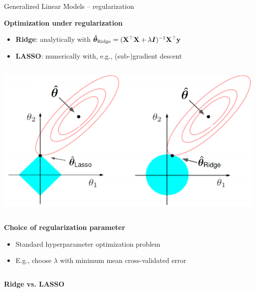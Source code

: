 \documentclass[11pt,compress,t,notes=noshow, xcolor=table]{beamer}
\newcommand{\highlight}[1]{\textcolor{hlcol}{\textbf{#1}}}
\begin{document}
\begin{vbframe}{Generalized Linear Models -- regularization}
\framebreak

\highlight{Optimization under regularization}
\begin{itemize}
  \item \textbf{Ridge}: analytically with 
  $\bm{\hat\theta}_{\text{Ridge}} = (\mathbf{X}^\top \mathbf{X}  + \lambda \bm{I})^{-1} \mathbf{X}^\top 
  \mathbf{y}$
  \item \textbf{LASSO}: numerically with, e.g., (sub-)gradient descent
\end{itemize}
  \begin{columns}
        \begin{column}{0.45\textwidth}
          \includegraphics[width=\textwidth]{figure/l1_l2_hat.png}
    \end{column}
\end{columns}



\medskip
\highlight{Choice of regularization parameter}

\begin{itemize}
  \item Standard hyperparameter optimization problem
  \item E.g., choose $\lambda$ with minimum mean cross-validated error 
\end{itemize}

\framebreak

\begin{columns}[T, totalwidth=\textwidth]
  \begin{column}{0.62\textwidth}

\highlight{Ridge vs. LASSO} 


\end{column}
\end{columns}
\end{vbframe}
\end{document}

